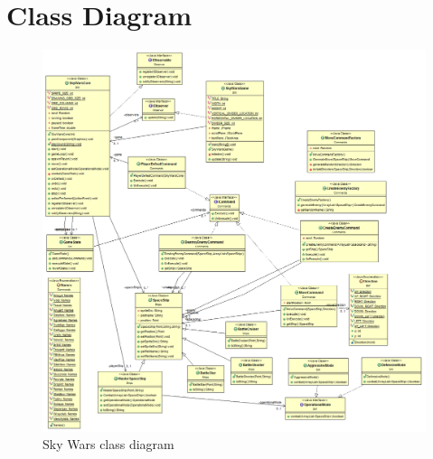 \documentclass{article}
\begin{document}
    \section{Class Diagram}
    	\begin{figure}[h]
  				\includegraphics[scale=0.35]{classdiagram}
  				\caption{Sky Wars class diagram}
  		\end{figure}
\end{document}
